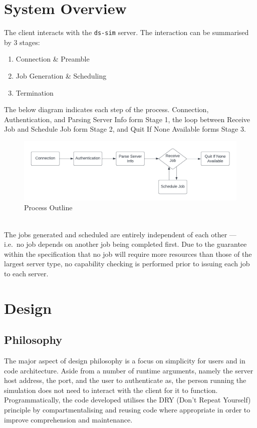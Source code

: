 \documentclass[a4paper]{article} %
\begin{document}
\section{System Overview} %
The client interacts with the \texttt{ds-sim} server. The interaction can be summarised by 3 stages: \\
\begin{enumerate}
    \item Connection \& Preamble
    \item Job Generation \& Scheduling
    \item Termination
\end{enumerate}
The below diagram indicates each step of the process. Connection, Authentication, and Parsing Server Info form Stage 1, the loop between Receive Job and Schedule Job form Stage 2, and Quit If None Available forms Stage 3.
\begin{figure}[h]
    \centering
    \includegraphics[width=\textwidth]{Workflow.png}
    \caption{Process Outline}
\end{figure}\\
The jobs generated and scheduled are entirely independent of each other --- i.e.\ no job depends on another job being completed first. Due to the guarantee within the specification that no job will require more resources 
than those of the largest server type, no capability checking is performed prior to issuing each job to each server.

\pagebreak
\section{Design} %
\subsection{Philosophy}
The major aspect of design philosophy is a focus on simplicity for users and in code architecture. Aside from a number of runtime arguments, namely the server host address, the port, and the user to authenticate as, the 
person running the simulation does not need to interact with the client for it to function. Programmatically, the code developed utilises the DRY (Don't Repeat Yourself) principle by compartmentalising and reusing code 
where appropriate in order to improve comprehension and maintenance.
\end{document}
